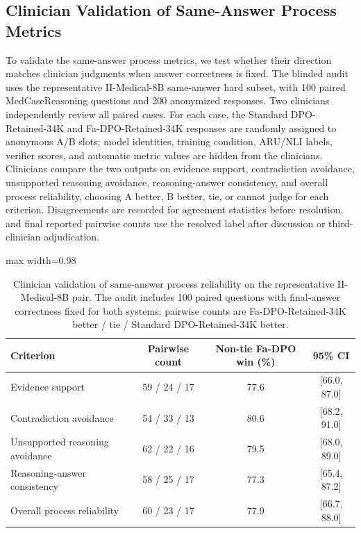\documentclass[a4paper,fleqn,doubleblind]{cas-sc}
\begin{document}
\subsection{Clinician Validation of Same-Answer Process Metrics}
\label{app:same_answer_clinician_details}

To validate the same-answer process metrics, we test whether their direction matches clinician judgments when answer correctness is fixed. The blinded audit uses the representative II-Medical-8B same-answer hard subset, with 100 paired MedCaseReasoning questions and 200 anonymized responses. Two clinicians independently review all paired cases. For each case, the Standard DPO-Retained-34K and Fa-DPO-Retained-34K responses are randomly assigned to anonymous A/B slots; model identities, training condition, ARU/NLI labels, verifier scores, and automatic metric values are hidden from the clinicians. Clinicians compare the two outputs on evidence support, contradiction avoidance, unsupported reasoning avoidance, reasoning-answer consistency, and overall process reliability, choosing A better, B better, tie, or cannot judge for each criterion. Disagreements are recorded for agreement statistics before resolution, and final reported pairwise counts use the resolved label after discussion or third-clinician adjudication.

\begin{table}[htbp]
    \centering
    \footnotesize
    \caption{Clinician validation of same-answer process reliability on the representative II-Medical-8B pair. The audit includes 100 paired questions with final-answer correctness fixed for both systems; pairwise counts are Fa-DPO-Retained-34K better / tie / Standard DPO-Retained-34K better.}
    \label{tab:same_answer_clinician_validation}
    \begin{adjustbox}{max width=0.98\textwidth}
    \begin{tabular}{lccc}
        \toprule
        \textbf{Criterion} & \textbf{Pairwise count} & \textbf{Non-tie Fa-DPO win (\%)} & \textbf{95\% CI} \\
        \midrule
        Evidence support & 59 / 24 / 17 & 77.6 & [66.0, 87.0] \\
        Contradiction avoidance & 54 / 33 / 13 & 80.6 & [68.2, 91.0] \\
        Unsupported reasoning avoidance & 62 / 22 / 16 & 79.5 & [68.0, 89.0] \\
        Reasoning-answer consistency & 58 / 25 / 17 & 77.3 & [65.4, 87.2] \\
        Overall process reliability & 60 / 23 / 17 & 77.9 & [66.7, 88.0] \\
        \bottomrule
    \end{tabular}
    \end{adjustbox}
\end{table}
\end{document}
